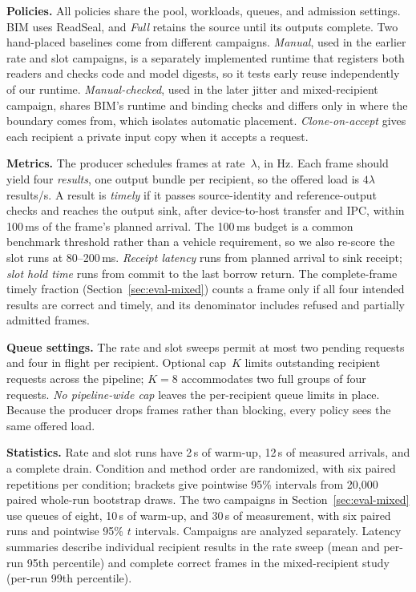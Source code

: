 \documentclass[conference]{IEEEtran}
\newcommand{\ms}{\,ms}
\begin{document}
\textbf{Policies.} All policies share the pool, workloads, queues, and admission settings. BIM uses ReadSeal, and \emph{Full} retains the source until its outputs complete. Two hand-placed baselines come from different campaigns. \emph{Manual}, used in the earlier rate and slot campaigns, is a separately implemented runtime that registers both readers and checks code and model digests, so it tests early reuse independently of our runtime. \emph{Manual-checked}, used in the later jitter and mixed-recipient campaign, shares BIM's runtime and binding checks and differs only in where the boundary comes from, which isolates automatic placement. \emph{Clone-on-accept} gives each recipient a private input copy when it accepts a request.

\textbf{Metrics.} The producer schedules frames at rate~$\lambda$, in Hz. Each frame should yield four \emph{results}, one output bundle per recipient, so the offered load is $4\lambda$ results/s. A result is \emph{timely} if it passes source-identity and reference-output checks and reaches the output sink, after device-to-host transfer and IPC, within 100\ms{} of the frame's planned arrival. The 100\ms{} budget is a common benchmark threshold rather than a vehicle requirement, so we also re-score the slot runs at 80--200\ms. \emph{Receipt latency} runs from planned arrival to sink receipt; \emph{slot hold time} runs from commit to the last borrow return. The complete-frame timely fraction (Section~\ref{sec:eval-mixed}) counts a frame only if all four intended results are correct and timely, and its denominator includes refused and partially admitted frames.

\textbf{Queue settings.} The rate and slot sweeps permit at most two pending requests and four in flight per recipient. Optional cap~$K$ limits outstanding recipient requests across the pipeline; $K{=}8$ accommodates two full groups of four requests. \emph{No pipeline-wide cap} leaves the per-recipient queue limits in place. Because the producer drops frames rather than blocking, every policy sees the same offered load.

\textbf{Statistics.} Rate and slot runs have 2\,s of warm-up, 12\,s of measured arrivals, and a complete drain. Condition and method order are randomized, with six paired repetitions per condition; brackets give pointwise 95\% intervals from 20,000 paired whole-run bootstrap draws. The two campaigns in Section~\ref{sec:eval-mixed} use queues of eight, 10\,s of warm-up, and 30\,s of measurement, with six paired runs and pointwise 95\% $t$ intervals. Campaigns are analyzed separately. Latency summaries describe individual recipient results in the rate sweep (mean and per-run 95th percentile) and complete correct frames in the mixed-recipient study (per-run 99th percentile).
\end{document}
